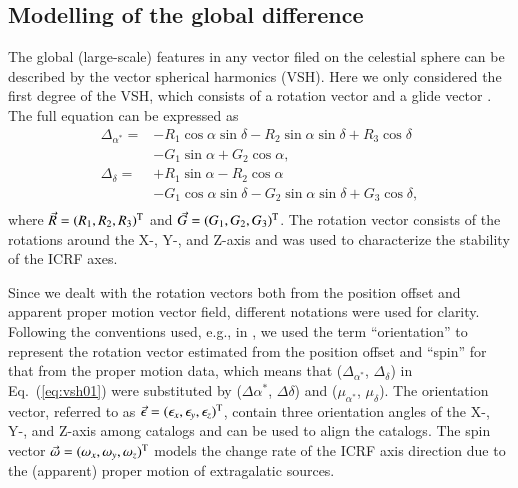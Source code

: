 \documentclass{aa}
\begin{document}

\subsection{Modelling of the global difference}  \label{subsec:vsh}
    
    The global (large-scale) features in any vector filed on the celestial sphere can be described by the vector spherical harmonics (VSH).
    Here we only considered the first degree of the VSH, which consists of a rotation vector  and a glide vector .
    The full equation can be expressed as
   \begin{equation} \label{eq:vsh01}
      \begin{array}{ll}
        \Delta_{\alpha^*}  = &-R_1\cos\alpha\sin\delta  - R_2\sin\alpha\sin\delta + R_3\cos\delta \\
                    &-G_1\sin\alpha            + G_2\cos\alpha, \\
        \Delta_{\delta}    = &+R_1\sin\alpha            - R_2\cos\alpha \\
                    &-G_1\cos\alpha\sin\delta  - G_2\sin\alpha\sin\delta + G_3\cos\delta, \\
     \end{array}
   \end{equation}
   where $\vec{R}=(R_1,R_2,R_3)^{\rm T}$ and $\vec{G}=(G_1,G_2,G_3)^{\rm T}$.
    The rotation vector consists of the rotations around the X-, Y-, and Z-axis and was used to characterize the stability of the ICRF axes.
    
    Since we dealt with the rotation vectors both from the position offset and apparent proper motion vector field, different notations were used for clarity.
    Following the conventions used, e.g., in \citet[][]{2018A&A...616A..14G}, we used the term ``orientation'' to represent the rotation vector estimated from the position offset and ``spin'' for that from the proper motion data, which means that ($\Delta_{\alpha^*}$, $\Delta_{\delta}$) in Eq.~(\ref{eq:vsh01}) were substituted by ($\Delta\alpha^*$, $\Delta\delta$) and ($\mu_{\alpha^*}$, $\mu_\delta$).
    The orientation vector, referred to as $\vec{\epsilon}=(\epsilon_x,\epsilon_y,\epsilon_z)^{\rm T}$, contain three orientation angles of the X-, Y-, and Z-axis among catalogs and can be used to align the catalogs.
    The spin vector $\vec{\omega}=(\omega_x,\omega_y,\omega_z)^{\rm T}$ models the change rate of the ICRF axis direction due to the (apparent) proper motion of extragalatic sources.
    
\end{document}
